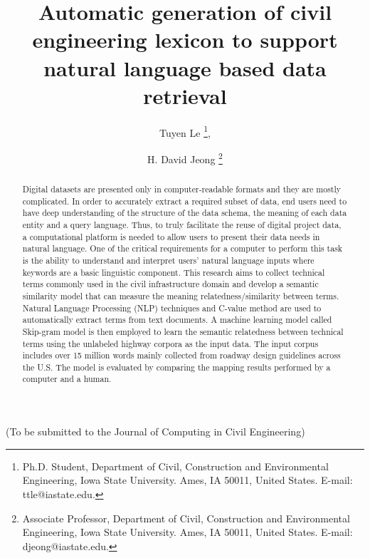 \documentclass[Journal, InsideFigs, DoubleSpace]{ascelike} %
\begin{document}
\title{Automatic generation of civil engineering lexicon to support natural language based data retrieval}

%
\author{
Tuyen Le
\thanks{
Ph.D. Student, Department of Civil, Construction and Environmental Engineering, Iowa State University. Ames, IA 50011, United States. E-mail: ttle@iastate.edu.},
\and
H. David Jeong
\thanks{Associate Professor, Department of Civil, Construction and Environmental Engineering, Iowa State University. Ames, IA 50011, United States. E-mail: djeong@iastate.edu.}
 }
\maketitle
%
\begin{center}
(To be submitted to the Journal of Computing in Civil Engineering) 
\end{center}
\begin{abstract} %
Digital datasets are presented only in computer-readable formats and they are mostly complicated. In order to accurately extract a required subset of data, end users need to have deep understanding of the structure of the data schema, the meaning of each data entity and a query language. Thus, to truly facilitate the reuse of digital project data, a computational platform is needed to allow users to present their data needs in natural language. One of the critical requirements for a computer to perform this task is the ability to understand and interpret users' natural language inputs where keywords are a basic linguistic component. This research aims to collect technical terms commonly used in the civil infrastructure domain and develop a semantic similarity model that can measure the meaning relatedness/similarity between terms. Natural Language Processing (NLP) techniques and C-value method are used to automatically extract terms from text documents. A machine learning model called Skip-gram model is then employed to learn the semantic relatedness between technical terms using the unlabeled highway corpora as the input data. The input corpus includes over 15 million words mainly collected from roadway design guidelines across the U.S. The model is evaluated by comparing the mapping results performed by a computer and a human. 
\end{abstract}
%
\end{document}
